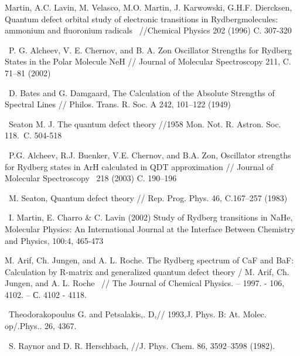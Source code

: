 \bibitem
	Martin, A.C. Lavin, M. Velasco, M.O. Martin, J. Karwowski, G.H.F. Diercksen, Quantum
defect orbital study of electronic transitions in Rydbergmolecules: ammonium and fluoronium radicals \ //Chemical
Physics 202 (1996) C. 307-320

\bibitem
	\ P. G. Alcheev, V. E. Chernov, and B. A. Zon Oscillator Strengths for Rydberg States in
the Polar Molecule NeH // Journal of Molecular Spectroscopy 211, C. 71--81 (2002)

\bibitem
	\ D. Bates and G. Damgaard, The Calculation of the Absolute Strengths of Spectral Lines
// Philos. Trans. R. Soc. A 242, 101--122 (1949)

\bibitem
	\ Seaton M. J. The quantum defect theory //1958 Mon. Not. R. Astron. Soc. 118.~C.
504-518

\bibitem
	\ P.G. Alcheev, R.J. Buenker, V.E. Chernov, and B.A. Zon, Oscillator strengths for
Rydberg states in ArH calculated in QDT approximation // Journal of Molecular Spectroscopy \ 218 (2003) C. 190--196

\bibitem
	\ M. Seaton, Quantum defect theory // Rep. Prog. Phys. 46, C.167--257 (1983)

\bibitem
	\ I. Martin, E. Charro \& C. Lavin (2002) Study of Rydberg transitions in NaHe,
Molecular Physics: An International Journal at the Interface Between Chemistry and Physics, 100:4, 465-473

\bibitem
	M. Arif, Ch. Jungen, and A. L. Roche. The Rydberg spectrum of CaF and BaF: Calculation
by R-matrix and generalized quantum defect theory / M. Arif, Ch. Jungen, and A. L. Roche \ // The Journal of Chemical
Physics. -- 1997. - 106, 4102. -- С. 4102 - 4118.

\bibitem
	\ Theodorakopoulus G. and Petsalakis,. D,// 1993,J. Phys. B: At. Molec. op/.Phys.. 26,
4367.

\bibitem
	\ S. Raynor and D. R. Herschbach, //J. Phys. Chem. 86, 3592--3598 (1982).


